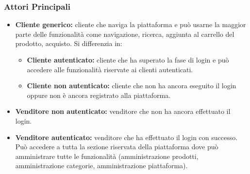 \subsubsection{Attori Principali}
\begin{itemize}
    \item \textbf{Cliente generico:} cliente che naviga la piattaforma e può usarne la maggior parte delle funzionalità come navigazione, ricerca, aggiunta al carrello del prodotto, acquisto. Si differenzia in: 
    \begin{itemize}
        \item \textbf{Cliente autenticato:} cliente che ha superato la fase di login e può accedere alle funzionalità riservate ai clienti autenticati.
        \item \textbf{Cliente non autenticato:} cliente che non ha ancora eseguito il login oppure non è ancora registrato alla piattaforma. 
    \end{itemize}
    \item \textbf{Venditore non autenticato:} venditore che non ha ancora effettuato il login.
    \item \textbf{Venditore autenticato:} venditore che ha effettuato il login con successo. Può accedere a tutta la sezione riservata della piattaforma dove può amministrare tutte le funzionalità (amministrazione prodotti, amministrazione categorie, amministrazione piattaforma).
\end{itemize}
